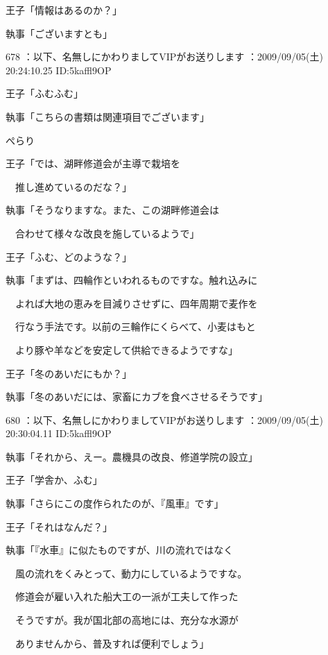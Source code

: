 \documentclass[a4j,twocolumn]{tarticle}
\begin{document}
王子「情報はあるのか？」\par{} 
執事「ございますとも」 

	
    
    

678 ：以下、名無しにかわりましてVIPがお送りします ：2009/09/05(土) 20:24:10.25 ID:5kaffl9OP 


王子「ふむふむ」\par{} 
執事「こちらの書類は関連項目でございます」 



ぺらり 



王子「では、湖畔修道会が主導で栽培を\par{} 
　推し進めているのだな？」 



執事「そうなりますな。また、この湖畔修道会は\par{} 
　合わせて様々な改良を施しているようで」 



王子「ふむ、どのような？」 



執事「まずは、四輪作といわれるものですな。触れ込みに\par{} 
　よれば大地の恵みを目減りさせずに、四年周期で麦作を\par{} 
　行なう手法です。以前の三輪作にくらべて、小麦はもと\par{} 
　より豚や羊などを安定して供給できるようですな」 



王子「冬のあいだにもか？」 



執事「冬のあいだには、家畜にカブを食べさせるそうです」 

	
    
    

680 ：以下、名無しにかわりましてVIPがお送りします ：2009/09/05(土) 20:30:04.11 ID:5kaffl9OP 


執事「それから、えー。農機具の改良、修道学院の設立」\par{} 
王子「学舎か、ふむ」 



執事「さらにこの度作られたのが、『風車』です」\par{} 
王子「それはなんだ？」 



執事「『水車』に似たものですが、川の流れではなく\par{} 
　風の流れをくみとって、動力にしているようですな。\par{} 
　修道会が雇い入れた船大工の一派が工夫して作った\par{} 
　そうですが。我が国北部の高地には、充分な水源が\par{} 
　ありませんから、普及すれば便利でしょう」 
\end{document}
